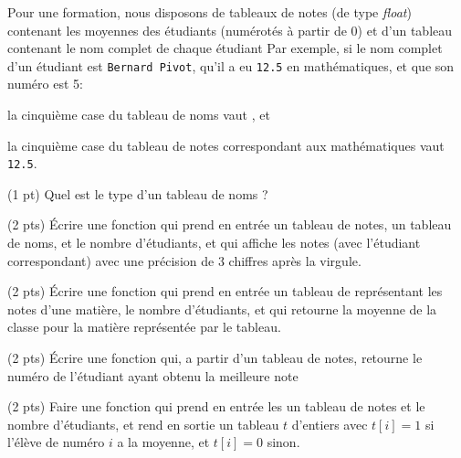 
Pour une formation, nous disposons de ta\-bleaux de notes (de type
\emph{float}) contenant les moyennes des {\'e}tudiants
(num{\'e}rot{\'e}s {\`a} partir de $0$) et d'un tableau contenant le
nom complet de chaque {\'e}tudiant Par exemple, si le nom complet d'un
{\'e}tudiant est \texttt{Bernard Pivot}, qu'il a eu \texttt{12.5} en
math{\'e}matiques, et que son num{\'e}ro est 5:
\begin{flist}
\item la cinqui{\`e}me case du tableau de noms vaut , et
\item la cinqui{\`e}me case du tableau de notes correspondant aux
  math{\'e}matiques vaut \texttt{12.5}.
\end{flist}

\begin{center}
\end{center}


\question (1 pt) Quel est le type d'un tableau de noms ?

\question (2 pts) {\'E}crire une fonction  qui prend en
entr{\'e}e un tableau de notes, un tableau de noms, et le nombre
d'{\'e}tu\-diants, et qui affiche les notes (avec l'{\'e}tudiant
correspondant) avec une pr{\'e}cision de 3 chiffres apr{\`e}s la
virgule.

\question (2 pts) {\'E}crire une fonction  qui prend en
entr{\'e}e un tableau de \cfloat repr{\'e}sentant les notes d'une
mati{\`e}re, le nombre d'{\'e}tu\-diants, et qui retourne la moyenne
de la classe pour la mati{\`e}re repr{\'e}sent{\'e}e par le tableau.


\question (2 pts) {\'E}crire une fonction  qui, a partir
d'un tableau de notes, retourne le num{\'e}ro de l'{\'e}tudiant ayant
obtenu la meilleure note

\question (2 pts) Faire une fonction  qui prend en
entr{\'e}e les un tableau de notes et le nombre d'{\'e}tudiants, et
rend en sortie un tableau $t$ d'entiers avec $t[i]=1$ si
l'{\'e}l{\`e}ve de num{\'e}ro $i$ a la moyenne, et $t[i]=0$ sinon.

